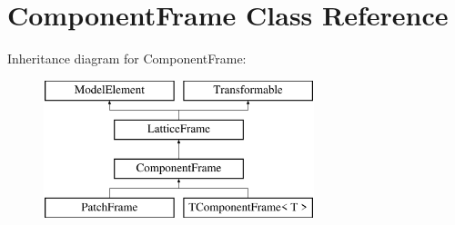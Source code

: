 \hypertarget{classComponentFrame}{}\section{Component\+Frame Class Reference}
\label{classComponentFrame}
Inheritance diagram for Component\+Frame\+:\begin{figure}[H]
\begin{center}
\leavevmode
\includegraphics[height=4.000000cm]{classComponentFrame}
\end{center}
\end{figure}

